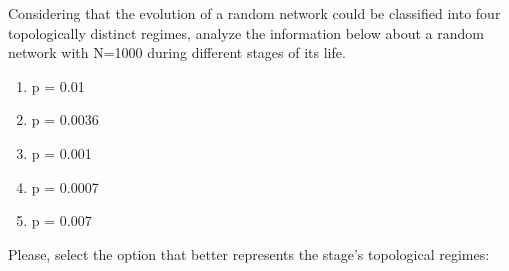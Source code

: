 
Considering that the evolution of a random network could be classified into four topologically distinct regimes, analyze the information below about a random network with N=1000 during different stages of its life.

\begin{enumerate}[label=\textbf{Stage \Roman*:}, leftmargin=*]
    \item p = 0.01
    \item p = 0.0036
    \item p = 0.001
    \item p = 0.0007
    \item p = 0.007
\end{enumerate}

Please, select the option that better represents the stage's topological regimes:


